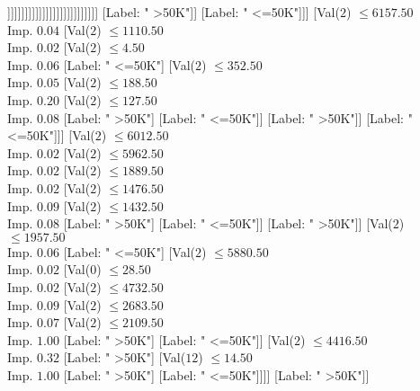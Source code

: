 \documentclass[margin=10pt]{standalone}
\begin{document}
\begin{forest}
																																			[Label: " <=50K"]
																																			[Val($2$) $ \leq 17221.50$ \\ Imp. $1.00$
																																				[Label: " >50K"]
																																				[Label: " <=50K"]]]]]]]]]]]]]]]]]]]]]]]]]]]
										[Label: " >50K"]]
									[Label: " <=50K"]]]
							[Val($2$) $ \leq 6157.50$ \\ Imp. $0.04$
								[Val($2$) $ \leq 1110.50$ \\ Imp. $0.02$
									[Val($2$) $ \leq 4.50$ \\ Imp. $0.06$
										[Label: " <=50K"]
										[Val($2$) $ \leq 352.50$ \\ Imp. $0.05$
											[Val($2$) $ \leq 188.50$ \\ Imp. $0.20$
												[Val($2$) $ \leq 127.50$ \\ Imp. $0.08$
													[Label: " >50K"]
													[Label: " <=50K"]]
												[Label: " >50K"]]
											[Label: " <=50K"]]]
									[Val($2$) $ \leq 6012.50$ \\ Imp. $0.02$
										[Val($2$) $ \leq 5962.50$ \\ Imp. $0.02$
											[Val($2$) $ \leq 1889.50$ \\ Imp. $0.02$
												[Val($2$) $ \leq 1476.50$ \\ Imp. $0.09$
													[Val($2$) $ \leq 1432.50$ \\ Imp. $0.08$
														[Label: " >50K"]
														[Label: " <=50K"]]
													[Label: " >50K"]]
												[Val($2$) $ \leq 1957.50$ \\ Imp. $0.06$
													[Label: " <=50K"]
													[Val($2$) $ \leq 5880.50$ \\ Imp. $0.02$
														[Val($0$) $ \leq 28.50$ \\ Imp. $0.02$
															[Val($2$) $ \leq 4732.50$ \\ Imp. $0.09$
																[Val($2$) $ \leq 2683.50$ \\ Imp. $0.07$
																	[Val($2$) $ \leq 2109.50$ \\ Imp. $1.00$
																		[Label: " >50K"]
																		[Label: " <=50K"]]
																	[Val($2$) $ \leq 4416.50$ \\ Imp. $0.32$
																		[Label: " >50K"]
																		[Val($12$) $ \leq 14.50$ \\ Imp. $1.00$
																			[Label: " >50K"]
																			[Label: " <=50K"]]]]
																[Label: " >50K"]]

\end{forest}
\end{document}
